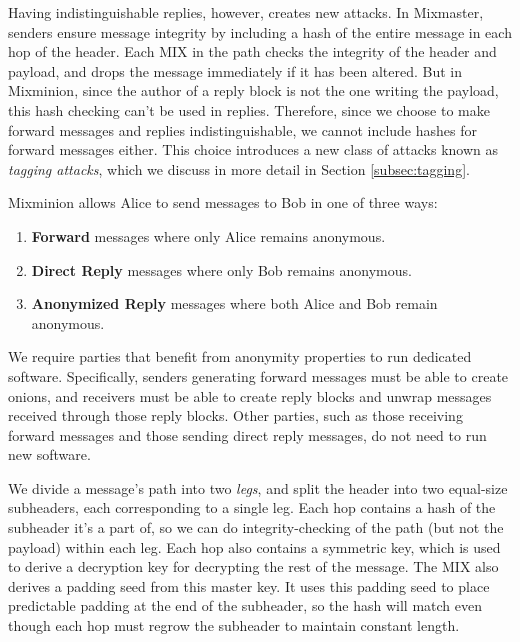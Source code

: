 \documentclass{llncs}
\begin{document}
Having indistinguishable replies, however, creates new attacks.  In
Mixmaster, senders ensure message integrity by including a hash of
the entire message in each hop of the header.  Each MIX in the path
checks the integrity of the header and payload, and drops the message
immediately if it has been altered.  But in Mixminion, since the
author of a reply block is not the one writing the payload, this
hash checking can't be used in replies. Therefore, since we choose to make
forward messages and replies indistinguishable, we cannot include
hashes for forward messages either. This choice introduces a new class
of attacks known as \emph{tagging attacks}, which we discuss in more
detail in Section \ref{subsec:tagging}.

Mixminion allows Alice to send messages to Bob in one of three ways:

\begin{enumerate}
\item \textbf{Forward} messages where only Alice remains anonymous.
\item \textbf{Direct Reply} messages where only Bob remains anonymous.
\item \textbf{Anonymized Reply} messages where both Alice and Bob
   remain anonymous.
\end{enumerate}

We require parties that benefit from anonymity properties to run dedicated
software.  Specifically, senders generating forward messages must be able
to create onions, and receivers must be able to create reply blocks
and unwrap messages received through those reply blocks. Other parties,
such as those receiving forward messages and those sending direct reply
messages, do not need to run new software.


We divide a message's path into two \emph{legs}, and split the header
into two equal-size subheaders, each corresponding to a single leg.
Each hop contains a hash of the subheader it's a part of, so we can do
integrity-checking of the path (but not the payload) within each leg.
Each hop also contains a symmetric key, which is used to derive a
decryption key for decrypting the rest of the message. The MIX also
derives a padding seed from this master key. It uses this padding seed
to place
predictable padding at the end of the subheader, so the hash will
match even though each hop must regrow the subheader to maintain
constant length.
\end{document}
